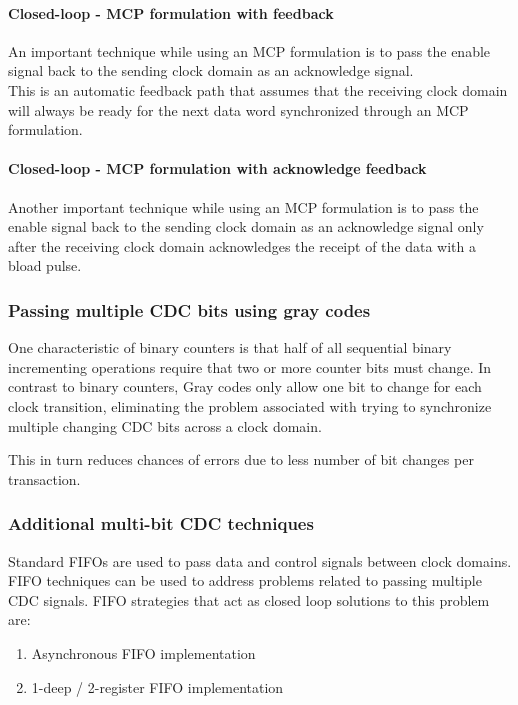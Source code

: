 \paragraph{Closed-loop - MCP formulation with feedback}
An important technique while using an MCP formulation is to pass the enable signal back to the sending clock domain as an acknowledge signal.\\
This is an automatic feedback path that assumes that the receiving clock domain will always be ready for the next data word synchronized through an MCP formulation.

\paragraph{Closed-loop - MCP formulation with acknowledge feedback}

Another important technique while using an MCP formulation is to pass the enable signal back to the sending clock domain as an acknowledge signal only after the receiving clock domain acknowledges the receipt of the data with a bload pulse.


\subsubsection{Passing multiple CDC bits using gray codes}
One characteristic of binary counters is that half of all sequential binary incrementing operations require that two or more counter bits must change.
In contrast to binary counters, Gray codes only allow one bit to change for each clock transition, eliminating the problem associated with trying to synchronize multiple changing CDC bits across a clock domain.

This in turn reduces chances of errors due to less number of bit changes per transaction.

\subsubsection{Additional multi-bit CDC techniques}
Standard FIFOs are used to pass data and control signals between clock domains. FIFO techniques can be used to address problems related to passing multiple CDC signals. FIFO strategies that act as closed loop solutions to this problem are:
\begin{enumerate}
	\item Asynchronous FIFO implementation
	\item 1-deep / 2-register FIFO implementation
\end{enumerate}

